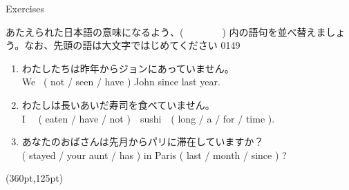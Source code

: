 \documentclass[aspectratio=169,xcolor={dvipsnames,table}]{beamer}
\newcommand{\myaudio}[1]{\href{#1}{\faVolumeUp}}
\begin{document}
\begin{frame}[plain]{Exercises}
 
{\small あたえられた日本語の意味になるよう、(~~~~~~~~) 内の語句を並べ替えましょう。なお、先頭の語は大文字ではじめてください}%
\hfill{\tiny 0149}\,{\scriptsize \myaudio{./audio/012_have_pp_keizoku_09.mp3}}


\begin{enumerate}
 \item {\small わたしたちは昨年からジョンにあっていません。}\\
We  ~( not / seen / have ) John since last year.\\
 \item  {\small わたしは長いあいだ寿司を食べていません。}\\
I ~~( eaten /  have / not )~~sushi~~( long / a / for / time ).\\
 \item  {\small あなたのおばさんは先月からパリに滞在していますか}？\bcdfrance\\
( stayed /  your aunt / has ) in Paris ( last / month / since ) ? \\
\end{enumerate}

\begin{textblock*}{0.4\linewidth}(360pt,125pt)
\end{textblock*}
\end{frame}
\end{document}
